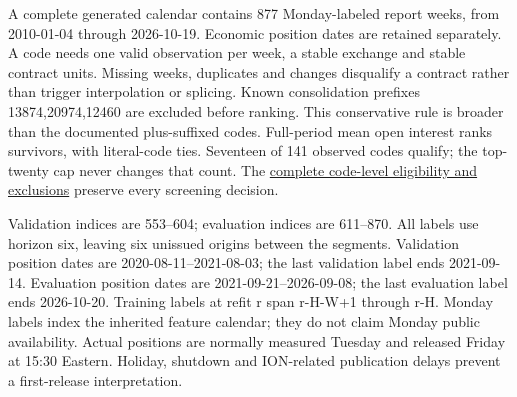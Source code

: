 \documentclass[12pt,a4paper]{article}
\begin{document}
A complete generated calendar contains 877 Monday-labeled report weeks, from 2010-01-04 through 2026-10-19. Economic position dates are retained separately. A code needs one valid observation per week, a stable exchange and stable contract units. Missing weeks, duplicates and changes disqualify a contract rather than trigger interpolation or splicing. Known consolidation prefixes 13874,20974,12460 are excluded before ranking. This conservative rule is broader than the documented plus-suffixed codes. Full-period mean open interest ranks survivors, with literal-code ties. Seventeen of 141 observed codes qualify; the top-twenty cap never changes that count.
The \href{https://github.com/ByronLi0207/financial-mathematics-paper-20261020/blob/revision-v10b/results/v10/cftc/eligibility.json}{complete code-level eligibility and exclusions} preserve every screening decision.

Validation indices are 553--604; evaluation indices are 611--870. All labels use horizon six, leaving six unissued origins between the segments. Validation position dates are 2020-08-11--2021-08-03; the last validation label ends 2021-09-14. Evaluation position dates are 2021-09-21--2026-09-08; the last evaluation label ends 2026-10-20. Training labels at refit r span r-H-W+1 through r-H. Monday labels index the inherited feature calendar; they do not claim Monday public availability. Actual positions are normally measured Tuesday and released Friday at 15:30 Eastern. Holiday, shutdown and ION-related publication delays prevent a first-release interpretation.
\end{document}
